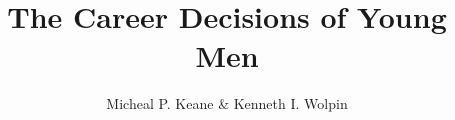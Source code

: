 

\title{The Career Decisions of Young Men}
\subtitle{}
\author{Micheal P. Keane \& Kenneth I. Wolpin}

\date{}

\let\otp\titlepage
